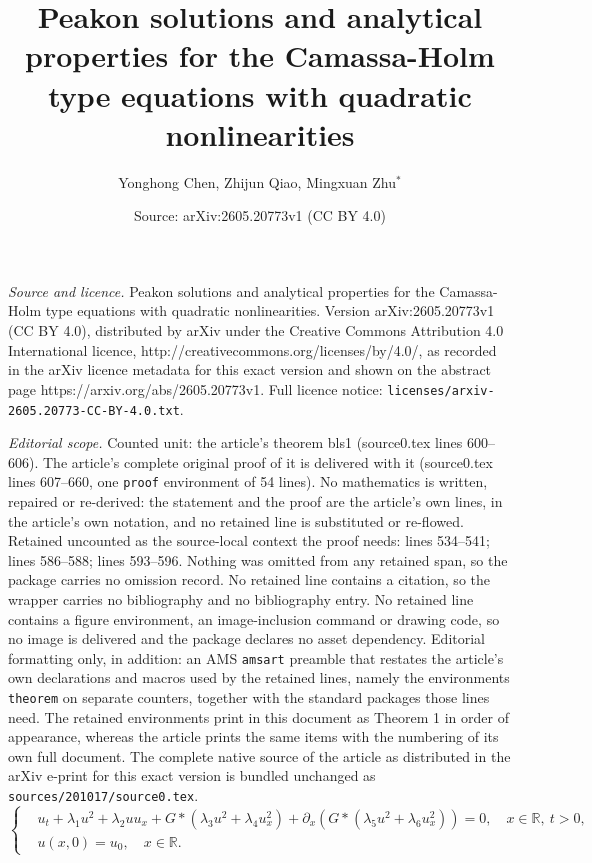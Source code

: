 \documentclass[10pt,a4paper]{amsart}
\title{Peakon solutions and analytical properties for the Camassa-Holm type equations with quadratic nonlinearities}
\author{Yonghong Chen, Zhijun Qiao, Mingxuan Zhu$^\ast$}
\date{Source: arXiv:2605.20773v1 (CC BY 4.0)}
\begin{document}
\maketitle

\noindent\emph{Source and licence.} Peakon solutions and analytical properties for the Camassa-Holm type equations with quadratic nonlinearities. Version arXiv:2605.20773v1 (CC BY 4.0), distributed by arXiv under the Creative Commons Attribution 4.0 International licence, http://creativecommons.org/licenses/by/4.0/, as recorded in the arXiv licence metadata for this exact version and shown on the abstract page https://arxiv.org/abs/2605.20773v1. Full licence notice: \texttt{licenses/arxiv-2605.20773-CC-BY-4.0.txt}.\par\smallskip

\noindent\textit{Editorial scope.} Counted unit: the article's theorem bls1 (source0.tex lines 600--606). The article's complete original proof of it is delivered with it (source0.tex lines 607--660, one \texttt{proof} environment of 54 lines). No mathematics is written, repaired or re-derived: the statement and the proof are the article's own lines, in the article's own notation, and no retained line is substituted or re-flowed.  Retained uncounted as the source-local context the proof needs: lines 534--541; lines 586--588; lines 593--596.  Nothing was omitted from any retained span, so the package carries no omission record.  No retained line contains a citation, so the wrapper carries no bibliography and no bibliography entry.  No retained line contains a figure environment, an image-inclusion command or drawing code, so no image is delivered and the package declares no asset dependency.  Editorial formatting only, in addition: an AMS \texttt{amsart} preamble that restates the article's own declarations and macros used by the retained lines, namely the environments \texttt{theorem} on separate counters, together with the standard packages those lines need.  The retained environments print in this document as Theorem 1 in order of appearance, whereas the article prints the same items with the numbering of its own full document.  The complete native source of the article as distributed in the arXiv e-print for this exact version is bundled unchanged as \texttt{sources/201017/source0.tex}.
\begin{equation}\label{Cauchyp}
\left\{
    \begin{aligned}
        &u_t + \lambda_1 u^2 + \lambda_2 u u_x + G\ast(\lambda_3 u^2 + \lambda_4 u_x^2) + \partial_x \left(  G \ast (\lambda_5 u^2 + \lambda_6 u_x^2) \right) = 0, \quad x\in\mathbb{R},\ t>0, \\
        &u(x,0)=u_0, \quad x\in\mathbb{R}.
    \end{aligned}
\right.
\end{equation}
\end{document}

